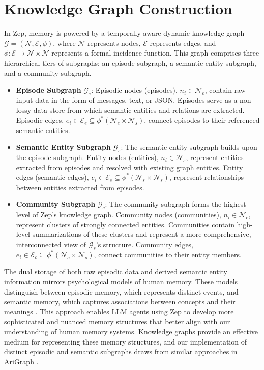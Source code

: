\documentclass{article}
\begin{document}
\section{Knowledge Graph Construction}
In Zep, memory is powered by a temporally-aware dynamic knowledge graph $\mathcal{G}=(\mathcal{N}, \mathcal{E}, \phi)$, where $\mathcal{N}$ represents nodes, $\mathcal{E}$ represents edges, and $\phi:\mathcal{E}\to\mathcal{N}\times\mathcal{N}$ represents a formal incidence function. This graph comprises three hierarchical tiers of subgraphs: an episode subgraph, a semantic entity subgraph, and a community subgraph.
\begin{itemize}
\item \textbf{Episode Subgraph} $\mathcal{G}_e$: Episodic nodes (episodes), $n_i\in\mathcal{N}_e$, contain raw input data in the form of messages, text, or JSON. Episodes serve as a non-lossy data store from which semantic entities and relations are extracted. Episodic edges, $e_i\in\mathcal{E}_e\subseteq\phi^*(\mathcal{N}_e\times\mathcal{N}_s)$, connect episodes to their referenced semantic entities.
\item \textbf{Semantic Entity Subgraph} $\mathcal{G}_s$: The semantic entity subgraph builds upon the episode subgraph. Entity nodes (entities), $n_i\in\mathcal{N}_s$, represent entities extracted from episodes and resolved with existing graph entities. Entity edges (semantic edges), $e_i\in\mathcal{E}_s\subseteq\phi^*(\mathcal{N}_s\times\mathcal{N}_s)$, represent relationships between entities extracted from episodes.
\item \textbf{Community Subgraph} $\mathcal{G}_c$: The community subgraph forms the highest level of Zep's knowledge graph. Community nodes (communities), $n_i\in\mathcal{N}_c$, represent clusters of strongly connected entities. Communities contain high-level summarizations of these clusters and represent a more comprehensive, interconnected view of $\mathcal{G}_s$'s structure. Community edges, $e_i\in\mathcal{E}_c\subseteq\phi^*(\mathcal{N}_c\times\mathcal{N}_s)$, connect communities to their entity members.
\end{itemize}

The dual storage of both raw episodic data and derived semantic entity information mirrors psychological models of human memory. These models distinguish between episodic memory, which represents distinct events, and semantic memory, which captures associations between concepts and their meanings \cite{gonzalez}. This approach enables LLM agents using Zep to develop more sophisticated and nuanced memory structures that better align with our understanding of human memory systems. Knowledge graphs provide an effective medium for representing these memory structures, and our implementation of distinct episodic and semantic subgraphs draws from similar approaches in AriGraph \cite{arigraph}.
\end{document}
